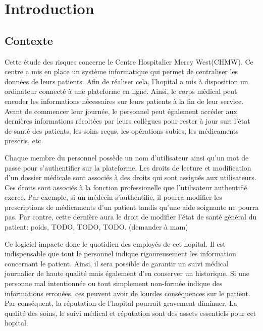 \documentclass[12pt]{article}
\begin{document}
\newpage
\renewcommand{\contentsname}{Table des matières}
\tableofcontents
\newpage

\section{Introduction} 

\subsection{Contexte}

\justify
Cette étude des risques concerne le Centre Hospitalier Mercy West(CHMW). Ce centre a mis en place un système informatique qui permet de centraliser les données de leurs patients. Afin de réaliser cela, l'hopital a mis à disposition un ordinateur connecté à une plateforme en ligne. Ainsi, le corps médical peut encoder les informations nécessaires sur leurs patients à la fin de leur service. Avant de commencer leur journée, le personnel peut également accéder aux dernières informations récoltées par leurs collègues pour rester à jour sur: l'état de santé des patients, les soins reçus, les opérations subies, les médicaments prescris, etc.

\justify
Chaque membre du personnel possède un nom d'utilisateur ainsi qu'un mot de passe pour s'authentifier sur la plateforme. Les droits de lecture et modification d'un dossier médicale sont associés à des droits qui sont assignés aux utilisateurs.  Ces droits sont associés à la fonction professionelle que l'utilisateur authentifié exerce. Par exemple, si un médecin s'authentifie, il pourra modifier les prescriptions de médicaments d'un patient tandis qu'une aide soignante ne pourra pas. Par contre, cette dernière aura le droit de modifier l'état de santé général du patient: poids, TODO, TODO, TODO. (demander à mam)

\justify
Ce logiciel impacte donc le quotidien des employés de cet hopital. Il est indispensable que tout le personnel indique rigoureusement les information concernant le patient. Ainsi, il sera possible de garantir un suivi médical journalier de haute qualité mais également d'en conserver un historique. Si une personne mal intentionnée ou tout simplement non-formée indique des informations erronées, ces peuvent avoir de lourdes conséquences sur le patient. Par conséquent, la réputation de l'hopital pourrait gravement diminuer. La qualité des soins, le suivi médical et réputation sont des assets essentiels pour cet hopital. 
\end{document}
